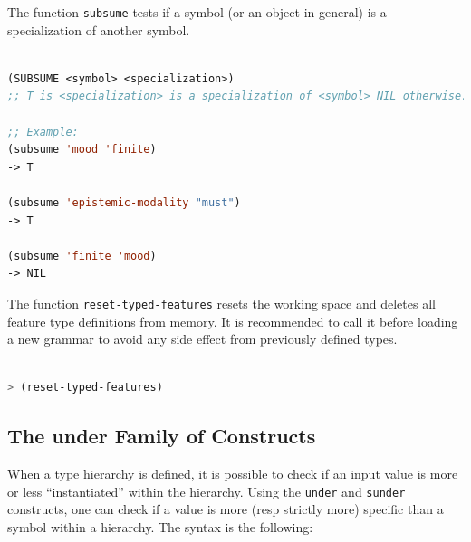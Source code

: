 \documentclass[10pt,a4paper]{report}
\begin{document}
The function {\tt subsume} tests if a symbol (or an object in general) is a
specialization of another symbol.  

\begin{lstlisting}[language=Lisp]

(SUBSUME <symbol> <specialization>)
;; T is <specialization> is a specialization of <symbol> NIL otherwise.

;; Example:  
(subsume 'mood 'finite)
-> T

(subsume 'epistemic-modality "must")
-> T

(subsume 'finite 'mood)
-> NIL
\end{lstlisting}

The function {\tt reset-typed-features} resets the working space and deletes
all feature type definitions from memory.  It is recommended to call it
before loading a new grammar to avoid any side effect from previously
defined types.

\begin{lstlisting}[language=Lisp]

> (reset-typed-features)

\end{lstlisting}


\subsection{The under Family of Constructs}

When a type hierarchy is defined, it is possible to check if an input value
is more or less ``instantiated'' within the hierarchy.  Using the {\tt under}
and {\tt sunder} constructs, one can check if a value is more (resp strictly
more) specific than a symbol within a hierarchy.  The syntax is the
following:
\end{document}

